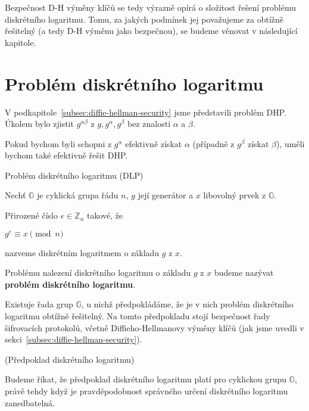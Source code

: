 \documentclass[
  program=infoi,
  biblatex,
  figures=false,
  glossaries,
  index
]{kidiplom}
\begin{document}
        Bezpečnost D-H výměny klíčů se tedy výrazně opírá o složitost řešení problému diskrétního logaritmu.
        Tomu, za jakých podmínek jej považujeme za obtížně řešitelný (a tedy D-H výměnu jako bezpečnou), se budeme věnovat v následující kapitole.
    

\section{Problém diskrétního logaritmu}\label{sec:discrete-log}
    
        V podkapitole~\ref{subsec:diffie-hellman-security} jsme představili problém DHP.
        Úkolem bylo zjistit $g^{\alpha \beta}$ z $g, g^\alpha, g^\beta$ bez znalosti $\alpha$ a $\beta$.

        Pokud bychom byli schopni z $g^\alpha$ efektivně získat $\alpha$ (případně z $g^\beta$ získat $\beta$), uměli bychom také
        efektivně řešit DHP.

        \begin{definition}
            Problém diskrétního logaritmu (DLP)
            
            Nechť $\mathbb{G}$ je cyklická grupa řádu $n$, $g$ její generátor a $x$ libovolný prvek z $\mathbb{G}$.

            Přirozené číslo $e \in \mathbb{Z}_n$ takové, že
                \begin{center}
                    $g^e \equiv x \pmod{n}$
                \end{center}
            
            nazveme diskrétním logaritmem o základu $g$ z $x$.

            Problému nalezení diskrétního logaritmu o základu $g$ z $x$ budeme nazývat \textbf{problém diskrétního logaritmu}.

        \end{definition}
        
        Existuje řada grup $\mathbb{G}$, u nichž předpokládáme, že je v nich problém diskrétního logaritmu obtížně řešitelný.
        Na tomto předpokladu stojí bezpečnost řady šifrovacích protokolů, včetně Diffieho-Hellmanovy výměny klíčů
        (jak jsme uvedli v sekci~\ref{subsec:diffie-hellman-security}).


        \begin{definition}
            (Předpoklad diskrétního logaritmu)
            
            Budeme říkat, že předpoklad diskrétního logaritmu platí pro cyklickou grupu $\mathbb{G}$, právě tehdy když
            je pravděpodobnost správného určení diskrétního logaritmu zanedbatelná. 

        \end{definition}
\end{document}
